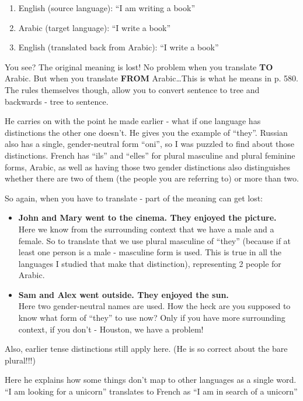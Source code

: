 \begin{enumerate}
	\item English (source language): ``I am writing a book''
	\item Arabic (target language): ``I write a book''
	\item English (translated back from Arabic): ``I write a book''
\end{enumerate}

You see? The original meaning is lost! No problem when you translate \textbf{TO}
 Arabic. But when you translate \textbf{FROM} Arabic\ldots This is what he means
  in p. 580. The rules themselves though, allow you to convert sentence to tree 
  and backwards - tree to sentence.

 He carries on with the point he made earlier - what if one language has
distinctions the other one doesn't. He gives you the example of ``they''.
Russian also has a single, gender-neutral form ``oni'', so I was puzzled to find
about those distinctions. French has ``ils'' and ``elles'' for plural masculine 
and plural feminine forms, Arabic, as well as having those two gender 
distinctions also distinguishes whether there are two of them (the people you 
are referring to) or more than two.

So again, when you have to translate - part of the meaning can get lost:

\begin{itemize}
	\item \textbf{John and Mary went to the cinema. They enjoyed the picture.}\\
	Here we know from the surrounding context that we have a male and a female. 
	So to translate that we use plural masculine of ``they'' (because if at 
	least one person is a male - masculine form is used. This is true in all the
	 languages I studied that make that distinction), representing 2 people for 
	 Arabic.
	\item \textbf{Sam and Alex went outside. They enjoyed the sun.} \\Here two 
	gender-neutral names are used. How the heck are you supposed to know what 
	form of ``they'' to use now? Only if you have more surrounding context, if 
	you don't - Houston, we have a problem!
\end{itemize} 

Also, earlier tense distinctions still apply here.
(He is so correct about the bare plural!!!)

 Here he explains how some things don't map to other languages as a single
word. ``I am looking for a unicorn'' translates to French as ``I am in search of
a unicorn''

